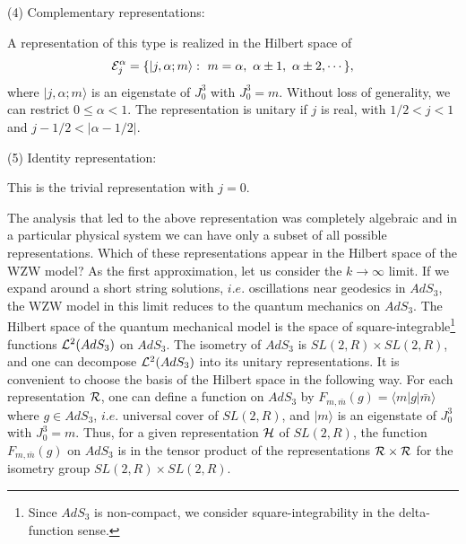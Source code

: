 \smallskip

\noindent
(4) Complementary representations:

A representation of this type is realized
in the Hilbert space of $${\cal E}_j^{\alpha}
= \{  |j ,\alpha; m \rangle :~  m = \alpha,~ \alpha \pm 1, 
~\alpha \pm 2, \cdots \},$$
where $|j,\alpha; m \rangle$ is an eigenstate
of $J_0^3$ with $J_0^3=m$. 
 Without loss of generality,
we can restrict $0 \leq \alpha <1$. 
The representation is unitary if $j$ is  real, with 
$1/2 < j < 1 $ and  $ j-1/2 < |\alpha -1/2|$.


\smallskip
\noindent
(5) Identity representation:

This is the trivial representation with $j=0$. 

\medskip

The analysis that led to the above representation was completely algebraic
and in a particular physical system we can have only a subset of all 
possible representations. 
Which of these representations appear in the
Hilbert space of the WZW model? As the first approximation,
let us consider the $k \rightarrow \infty$ limit.
If we expand around a short string solutions, $i.e.$
oscillations near geodesics in $AdS_3$, 
the WZW model in this limit reduces to the quantum 
mechanics on $AdS_3$. The Hilbert space
of the quantum mechanical model is the space of 
square-integrable\footnote{Since $AdS_3$ 
is non-compact, we consider 
square-integrability in the delta-function sense.}
 functions ${\cal L}^2(AdS_3)$ on $AdS_3$.   
The isometry of $AdS_3$ is 
$SL(2,R) \times SL(2,R)$, and one can decompose
${\cal L}^2(AdS_3)$ into its unitary representations.
It is convenient to choose the basis of the Hilbert space
in the following way.  For each representation
${\cal R}$, one can define a function on $AdS_3$ by 
$F_{m, \bar{m}}(g) = \langle m | g | \bar{m} \rangle$
where $g \in AdS_3$, $i.e.$ universal cover of $SL(2,R)$, 
and $|m \rangle$ is an eigenstate of $J_0^3$ with $J_0^3=m$. 
Thus, for a given representation ${\cal H}$ of
$SL(2,R)$, the function $F_{m,\bar{m}}(g)$
on $AdS_3$ is in the tensor product of the representations
${\cal R} \times {\cal R}$
for the isometry group $SL(2,R) \times SL(2,R)$.
